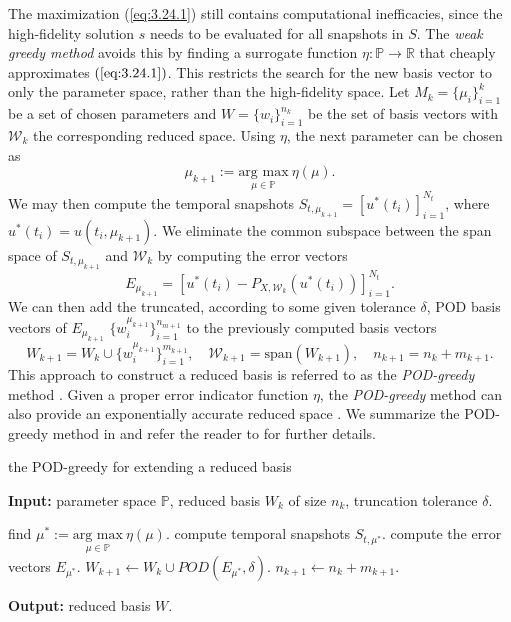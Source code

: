 The maximization (\ref{eq:3.24.1}) still contains computational inefficacies, since the high-fidelity solution $s$ needs to be evaluated for all snapshots in $S$. The \emph{weak greedy method} avoids this by finding a surrogate function $\eta:\mathbb P \to \mathbb R$ that cheaply approximates $(\ref{eq:3.24.1})$. This restricts the search for the new basis vector to only the parameter space, rather than the high-fidelity space. Let $M_k=\{\mu_i\}_{i=1}^k$ be a set of chosen parameters and $W = \{ w_i\}_{i=1}^{n_k}$ be the set of basis vectors with $\mathcal W_k$ the corresponding reduced space. Using $\eta$, the next parameter can be chosen as
\begin{equation}
	\mu_{k+1} := \underset{\mu \in \mathbb P}{\text{arg\ max}} \ \eta(\mu).
\end{equation}
We may then compute the temporal snapshots $S_{t,\mu_{k+1}} = [ u^*(t_i) ]_{i=1}^{N_t}$, where $u^*(t_i) = u(t_i,\mu_{k+1})$. We eliminate the common subspace between the span space of $S_{t,\mu_{k+1}}$ and $\mathcal W_k$ by computing the error vectors 
\begin{equation}
	E_{\mu_{k+1}} = \left[ u^*(t_i) - P_{X,\mathcal W_k} (u^*(t_i)) \right]_{i=1}^{N_t}.
\end{equation}
We can then add the truncated, according to some given tolerance $\delta$, POD basis vectors of $E_{\mu_{k+1}}$ $\{w^{\mu_{k+1}}_i\}_{i=1}^{n_{m+1}}$ to the previously computed basis vectors
\begin{equation}
	W_{k+1} = W_{k} \cup \{w^{\mu_{k+1}}_i\}_{i=1}^{m_{k+1}}, \quad \mathcal W_{k+1} = \text{span}(W_{k+1}), \quad n_{k+1} = n_k + m_{k+1}.
\end{equation}
This approach to construct a reduced basis is referred to as the \emph{POD-greedy} method \cite{haasdonk2008reduced}. Given a proper error indicator function $\eta$, the \emph{POD-greedy} method can also provide an exponentially accurate reduced space \cite{haasdonk2008reduced,haasdonk2013convergence}. We summarize the POD-greedy method in  and refer the reader to \cite{hesthaven2015certified,haasdonk2013convergence} for further details.

\begin{algorithm} 
	\caption{the POD-greedy for extending a reduced basis} \label{alg:3.3.1}
	\textbf{Input:} parameter space $\mathbb P$, reduced basis $W_k$ of size $n_k$, truncation tolerance $\delta$.
	\begin{algorithmic} [1]
		\State find $\mu^* := \underset{\mu \in \mathbb P}{\text{arg\ max}} \ \eta(\mu)$.
		\State compute temporal snapshots $S_{t,\mu^*}$.
		\State compute the error vectors $E_{\mu^*}$.
		\State $W_{k+1} \leftarrow W_{k} \cup POD(E_{\mu^*},\delta)$.
		\State $n_{k+1} \leftarrow n_k + m_{k+1}$.
	\end{algorithmic}
	\vspace{0.5cm}
	\textbf{Output:} reduced basis $W$.
\end{algorithm}




